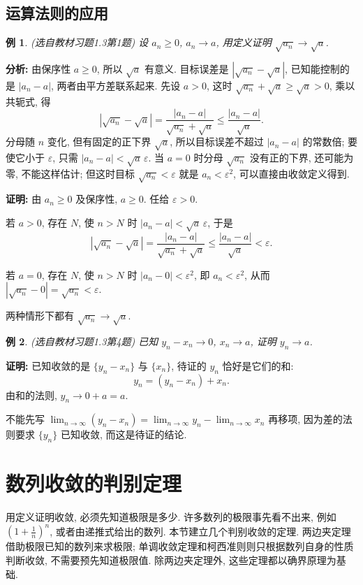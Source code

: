\documentclass[UTF8,openany]{ctexbook}
\theoremstyle{chinesetextbook}
\newtheorem{example}{例}[section]
\newenvironment{cnproof}{\par\indent\textbf{证明:} \ignorespaces}{\par}
\begin{document}
\subsection{运算法则的应用}
\begin{example}
\textnormal{(选自教材习题1.3第1题)} 设 $a_n\ge0$, $a_n\to a$, 用定义证明 $\sqrt{a_n}\to\sqrt a$.
\end{example}
\par\indent\textbf{分析:} 由保序性 $a\ge0$, 所以 $\sqrt a$ 有意义. 目标误差是 $|\sqrt{a_n}-\sqrt a|$, 已知能控制的是 $|a_n-a|$, 两者由平方差联系起来. 先设 $a>0$, 这时 $\sqrt{a_n}+\sqrt a\ge\sqrt a>0$, 乘以共轭式, 得
\[
|\sqrt{a_n}-\sqrt a|=\frac{|a_n-a|}{\sqrt{a_n}+\sqrt a}\le\frac{|a_n-a|}{\sqrt a}.
\]
分母随 $n$ 变化, 但有固定的正下界 $\sqrt a$, 所以目标误差不超过 $|a_n-a|$ 的常数倍; 要使它小于 $\varepsilon$, 只需 $|a_n-a|<\sqrt a\,\varepsilon$. 当 $a=0$ 时分母 $\sqrt{a_n}$ 没有正的下界, 还可能为零, 不能这样估计; 但这时目标 $\sqrt{a_n}<\varepsilon$ 就是 $a_n<\varepsilon^2$, 可以直接由收敛定义得到.
\begin{cnproof}
由 $a_n\ge0$ 及保序性, $a\ge0$. 任给 $\varepsilon>0$.

若 $a>0$, 存在 $N$, 使 $n>N$ 时 $|a_n-a|<\sqrt a\,\varepsilon$, 于是
\[
|\sqrt{a_n}-\sqrt a|=\frac{|a_n-a|}{\sqrt{a_n}+\sqrt a}\le\frac{|a_n-a|}{\sqrt a}<\varepsilon.
\]

若 $a=0$, 存在 $N$, 使 $n>N$ 时 $|a_n-0|<\varepsilon^2$, 即 $a_n<\varepsilon^2$, 从而 $|\sqrt{a_n}-0|=\sqrt{a_n}<\varepsilon$.

两种情形下都有 $\sqrt{a_n}\to\sqrt a$.
\end{cnproof}
\begin{example}
\textnormal{(选自教材习题1.3第4题)} 已知 $y_n-x_n\to0$, $x_n\to a$, 证明 $y_n\to a$.
\end{example}
\begin{cnproof}
已知收敛的是 $\{y_n-x_n\}$ 与 $\{x_n\}$, 待证的 $y_n$ 恰好是它们的和:
\[
y_n=(y_n-x_n)+x_n.
\]
由和的法则, $y_n\to0+a=a$.
\end{cnproof}
不能先写 $\displaystyle\lim_{n\to\infty}(y_n-x_n)=\lim_{n\to\infty}y_n-\lim_{n\to\infty}x_n$ 再移项, 因为差的法则要求 $\{y_n\}$ 已知收敛, 而这是待证的结论.
\section{数列收敛的判别定理}
用定义证明收敛, 必须先知道极限是多少. 许多数列的极限事先看不出来, 例如 $\displaystyle\left(1+\frac1n\right)^n$, 或者由递推式给出的数列. 本节建立几个判别收敛的定理. 两边夹定理借助极限已知的数列来求极限; 单调收敛定理和柯西准则则只根据数列自身的性质判断收敛, 不需要预先知道极限值. 除两边夹定理外, 这些定理都以确界原理为基础.
\end{document}
